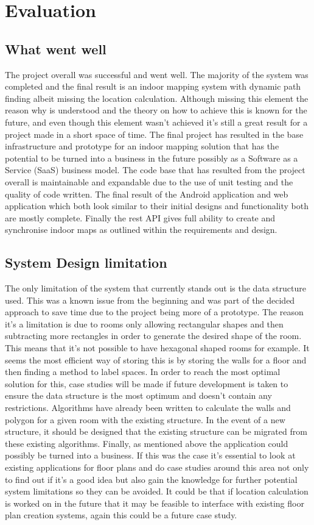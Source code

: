 \section{Evaluation}
\subsection{What went well} %
The project overall was successful and went well. The majority of the system was completed and the final result is an indoor mapping system with dynamic path finding albeit missing the location calculation. Although missing this element the reason why is understood and the theory on how to achieve this is known for the future, and even though this element wasn't achieved it's still a great result for a project made in a short space of time. The final project has resulted in the base infrastructure and prototype for an indoor mapping solution that has the potential to be turned into a business in the future possibly as a Software as a Service (SaaS) business model. The code base that has resulted from the project overall is maintainable and expandable due to the use of unit testing and the quality of code written. The final result of the Android application and web application which both look similar to their initial designs and functionality both are mostly complete. Finally the rest API gives full ability to create and synchronise indoor maps as outlined within the requirements and design.

\subsection{System Design limitation}
The only limitation of the system that currently stands out is the data structure used. This was a known issue from the beginning and was part of the decided approach to save time due to the project being more of a prototype. The reason it's a limitation is due to rooms only allowing rectangular shapes and then subtracting more rectangles in order to generate the desired shape of the room. This means that it's not possible to have hexagonal shaped rooms for example. It seems the most efficient way of storing this is by storing the walls for a floor and then finding a method to label spaces. In order to reach the most optimal solution for this, case studies will be made if future development is taken to ensure the data structure is the most optimum and doesn't contain any restrictions. Algorithms have already been written to calculate the walls and polygon for a given room with the existing structure. In the event of a new structure, it should be designed that the existing structure can be migrated from these existing algorithms. Finally, as mentioned above the application could possibly be turned into a business. If this was the case it's essential to look at existing applications for floor plans and do case studies around this area not only to find out if it's a good idea but also gain the knowledge for further potential system limitations so they can be avoided. It could be that if location calculation is worked on in the future that it may be feasible to interface with existing floor plan creation systems, again this could be a future case study.

